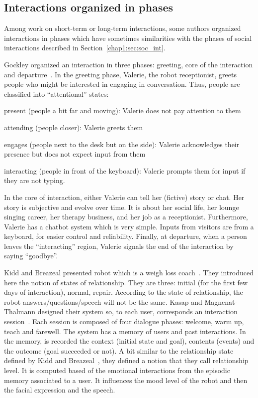 \documentclass[a4paper,11pt,twoside]{StyleThese}
\begin{document}
\subsection{Interactions organized in phases}\label{chap2:subsec:inter_div}
Among work on short-term or long-term interactions, some authors organized interactions in phases which have sometimes similarities with the phases of social interactions described in Section~\ref{chap1:sec:soc_int}.

Gockley \etal{} organized an interaction in three phases: greeting, core of the interaction and departure~\cite{gockley_2005_designing}. In the greeting phase, Valerie, the robot receptionist, greets people who might be interested in engaging in conversation. Thus, people are classified into ``attentional'' states:
\begin{bulletList}
	\item present (people a bit far and moving): Valerie does not pay attention to them
	\item attending (people closer): Valerie greets them
	\item engages (people next to the desk but on the side): Valerie acknowledges their presence but does not expect input from them
	\item interacting (people in front of the keyboard): Valerie prompts them for input if they are not typing.
\end{bulletList}
In the core of interaction, either Valerie can tell her (fictive) story or chat. Her story is subjective and evolve over time. It is about her social life, her lounge singing career, her therapy business, and her job as a receptionist. Furthermore, Valerie has a chatbot system which is very simple. Inputs from visitors are from a keyboard, for easier control and reliability. Finally, at departure, when a person leaves the ``interacting'' region, Valerie signals the end of the interaction by saying ``goodbye''. 

Kidd and Breazeal presented robot which is a weigh loss coach~\cite{kidd_2008_robots}. They introduced here the notion of states of relationship. They are three: initial (for the first few days of interaction), normal, repair. According to the state of relationship, the robot answers/questions/speech will not be the same. Kasap and Magnenat-Thalmann designed their system so, to each user, corresponds an interaction session~\cite{kasap_2012_building}. Each session is composed of four dialogue phases: welcome, warm up, teach and farewell. The system has a memory of users and past interactions. In the memory, is recorded the context (initial state and goal), contents (events) and the outcome (goal succeeded or not). A bit similar to the relationship state defined by Kidd and Breazeal~\cite{kidd_2008_robots}, they defined a notion that they call relationship level. It is computed based of the emotional interactions from the episodic memory associated to a user. It influences the mood level of the robot and then the facial expression and the speech.
\end{document}
